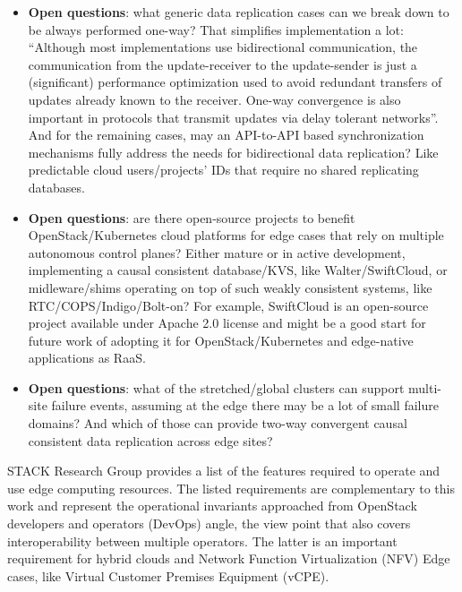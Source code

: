 \documentclass[conference]{IEEEtran}
\begin{document}
\begin{itemize}
  \item \textbf{Open questions}: what generic data replication cases can we
    break down to be always performed one-way? That simplifies implementation a
    lot: ``Although most implementations use bidirectional communication, the
    communication from the update-receiver to the update-sender is just a
    (significant) performance optimization used to avoid redundant transfers of
    updates already known to the receiver. One-way convergence is also
    important in protocols that transmit updates via delay tolerant
    networks''\cite{b2}. And for the remaining cases, may an API-to-API based
    synchronization mechanisms fully address the needs for bidirectional data
    replication? Like predictable cloud users/projects' IDs that require no
    shared replicating databases.
  \item \textbf{Open questions}: are there open-source projects to benefit
    OpenStack/Kubernetes cloud platforms for edge cases that rely on multiple
    autonomous control planes? Either mature or in active development,
    implementing a causal consistent database/KVS, like Walter/SwiftCloud, or
    midleware/shims operating on top of such weakly consistent systems, like
    RTC/COPS/Indigo/Bolt-on? For example, SwiftCloud is an open-source project
    available under Apache 2.0 license and might be a good start for future
    work of adopting it for OpenStack/Kubernetes and edge-native applications
    as RaaS.
  \item \textbf{Open questions}: what of the stretched/global clusters can
    support multi-site failure events, assuming at the edge there may be a lot
    of small failure domains? And which of those can provide two-way
    convergent causal consistent data replication across edge sites?
\end{itemize}

STACK Research Group\cite{b8} provides a list of the features required to
operate and use edge computing resources. The listed requirements are
complementary to this work and represent the operational invariants approached
from OpenStack developers and operators (DevOps) angle, the view point that
also covers interoperability between multiple operators. The latter is an
important requirement for hybrid clouds and Network Function Virtualization
(NFV) Edge cases, like Virtual Customer Premises Equipment (vCPE).
\end{document}
